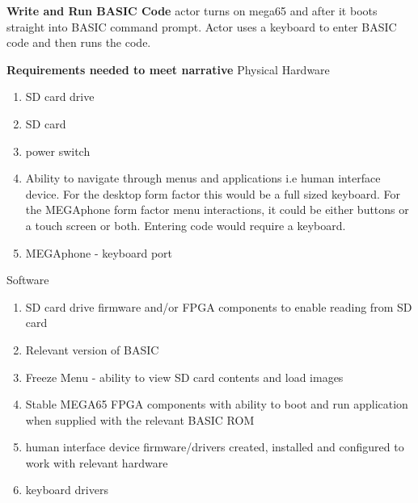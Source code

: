 \textbf{Write and Run BASIC Code}
actor turns on mega65 and after it boots straight into BASIC command prompt. Actor uses a keyboard to enter BASIC code and then runs the code.

\textbf{Requirements needed to meet narrative}
Physical Hardware
\begin{enumerate}
\item SD card drive
\item SD card
\item power switch
\item Ability to navigate through menus and applications i.e human interface device. For the desktop form factor this would be a full sized keyboard. For the MEGAphone form factor menu interactions, it could be either buttons or a touch screen or both. Entering code would require a keyboard.
\item MEGAphone - keyboard port
\end{enumerate}

Software
\begin{enumerate}
\item SD card drive firmware and/or FPGA components to enable reading from SD card
\item Relevant version of BASIC 
\item Freeze Menu - ability to view SD card contents and load images
\item Stable MEGA65 FPGA components with ability to boot and run application when supplied with the relevant BASIC ROM
\item human interface device firmware/drivers created, installed and configured to work with relevant hardware
\item keyboard drivers
\end{enumerate}